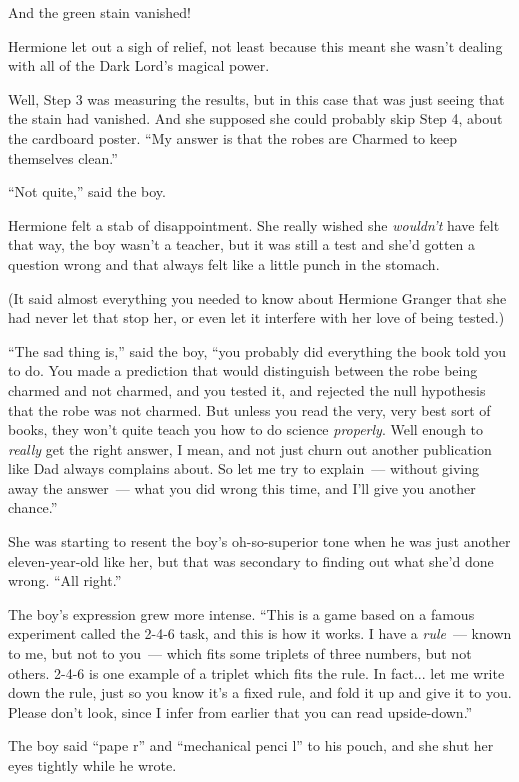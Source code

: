 And the green stain vanished!

Hermione let out a sigh of relief, not least because this meant she wasn't dealing with all of the Dark Lord's magical power.

Well, Step 3 was measuring the results, but in this case that was just seeing that the stain had vanished. And she supposed she could probably skip Step 4, about the cardboard poster. ``My answer is that the robes are Charmed to keep themselves clean.''

``Not quite,'' said the boy.

Hermione felt a stab of disappointment. She really wished she \emph{wouldn't} have felt that way, the boy wasn't a teacher, but it was still a test and she'd gotten a question wrong and that always felt like a little punch in the stomach.

(It said almost everything you needed to know about Hermione Granger that she had never let that stop her, or even let it interfere with her love of being tested.)

``The sad thing is,'' said the boy, ``you probably did everything the book told you to do. You made a prediction that would distinguish between the robe being charmed and not charmed, and you tested it, and rejected the null hypothesis that the robe was not charmed. But unless you read the very, very best sort of books, they won't quite teach you how to do science \emph{properly}. Well enough to \emph{really} get the right answer, I mean, and not just churn out another publication like Dad always complains about. So let me try to explain~--- without giving away the answer~--- what you did wrong this time, and I'll give you another chance.''

She was starting to resent the boy's oh-so-superior tone when he was just another eleven-year-old like her, but that was secondary to finding out what she'd done wrong. ``All right.''

The boy's expression grew more intense. ``This is a game based on a famous experiment called the 2-4-6 task, and this is how it works. I have a \emph{rule}~--- known to me, but not to you~--- which fits some triplets of three numbers, but not others. 2-4-6 is one example of a triplet which fits the rule. In fact... let me write down the rule, just so you know it's a fixed rule, and fold it up and give it to you. Please don't look, since I infer from earlier that you can read upside-down.''

The boy said ``pape r'' and ``mechanical penci l'' to his pouch, and she shut her eyes tightly while he wrote.


